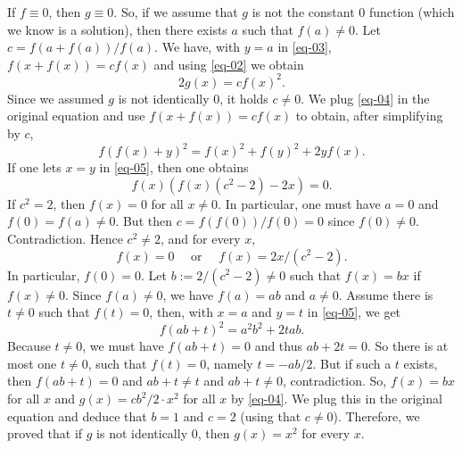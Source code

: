 {If $f\equiv 0$, then $g\equiv 0$. So, if we assume that $g$ is not the constant 0 function (which we know is a solution), then there exists $a$ such that $f(a)\neq 0$. Let $c=f(a+f(a))/f(a)$. We have, with $y=a$ in \eqref{eq-03}, $f(x+f(x))=cf(x)$ and using \eqref{eq-02} we obtain
\begin{equation}\label{eq-04}
    2g(x)=cf(x)^2.
\end{equation}
Since we assumed $g$ is not identically $0$, it holds $c\neq 0$. We plug \eqref{eq-04} in the original equation and use $f(x+f(x))=cf(x)$ to obtain, after simplifying by $c$,
\begin{equation}\label{eq-05}
    f(f(x)+y)^2=f(x)^2+f(y)^2+2yf(x).
\end{equation}
If one lets $x=y$ in \eqref{eq-05}, then one obtains
\begin{equation}\label{eq-06}
    f(x)(f(x)(c^2-2)-2x)=0.
\end{equation}
If $c^2=2$, then $f(x)=0$ for all $x\neq 0$. In particular, one must have $a=0$ and $f(0)=f(a)\neq 0$. But then $c=f(f(0))/f(0)=0$ since $f(0)\neq 0$. Contradiction. Hence $c^2\neq 2$, and for every $x$,
\[
f(x)=0\quad \text{ or }\quad f(x)=2x/(c^2-2).
\]
In particular, $f(0)=0$. Let $b:=2/(c^2-2)\neq 0$ such that $f(x)=bx$ if $f(x)\neq 0$. Since $f(a)\neq 0$, we have $f(a)=ab$ and $a\neq 0$.   Assume there is $t\neq 0$ such that $f(t)=0$, then, with $x=a$ and $y=t$ in \eqref{eq-05}, we get
\[
f(ab+t)^2=a^2b^2+2tab.
\]
Because $t\neq 0$, we must have $f(ab+t)=0$ and thus $ab+2t=0$. So there is at most one $t\neq 0$, such that $f(t)=0$, namely $t=-ab/2$. But if such a $t$ exists, then $f(ab+t)=0$ and $ab+t\neq t$ and $ab+t\neq 0$, contradiction. So, $f(x)=bx$ for all $x$ and $g(x)=cb^2/2\cdot x^2$ for all $x$ by \eqref{eq-04}. We plug this in the original equation and deduce that $b=1$ and $c=2$ (using that $c\neq 0$). Therefore, we proved that if $g$ is not identically $0$, then $g(x)=x^2$ for every $x$.


}
